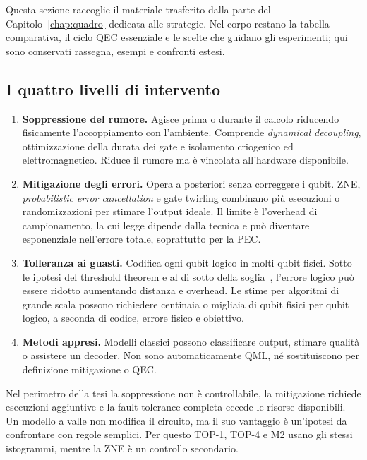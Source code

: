 Questa sezione raccoglie il materiale trasferito dalla parte del
Capitolo~\ref{chap:quadro} dedicata alle strategie. Nel corpo restano la tabella
comparativa, il ciclo QEC essenziale e le scelte che guidano gli esperimenti;
qui sono conservati rassegna, esempi e confronti estesi.

\subsection{I quattro livelli di intervento}

\begin{enumerate}
    \item \textbf{Soppressione del rumore.} Agisce prima o durante il calcolo
    riducendo fisicamente l'accoppiamento con l'ambiente. Comprende
    \emph{dynamical decoupling}, ottimizzazione della durata dei gate e
    isolamento criogenico ed elettromagnetico. Riduce il rumore ma è vincolata
    all'hardware disponibile.

    \item \textbf{Mitigazione degli errori.} Opera a posteriori senza
    correggere i qubit. \ac{ZNE}, \emph{probabilistic error cancellation} e
    gate twirling combinano più esecuzioni o randomizzazioni per stimare
    l'output ideale. Il limite è l'overhead di campionamento, la cui legge
    dipende dalla tecnica e può diventare esponenziale nell'errore totale,
    soprattutto per la PEC.

    \item \textbf{Tolleranza ai guasti.} Codifica ogni qubit logico in molti
    qubit fisici. Sotto le ipotesi del threshold theorem e al di sotto della
    soglia~\cite{aharonov1997fault}, l'errore logico può essere ridotto
    aumentando distanza e overhead. Le stime per algoritmi di grande scala
    possono richiedere centinaia o migliaia di qubit fisici per qubit logico,
    a seconda di codice, errore fisico e obiettivo.

    \item \textbf{Metodi appresi.} Modelli classici possono classificare
    output, stimare qualità o assistere un decoder. Non sono automaticamente
    \ac{QML}, né sostituiscono per definizione mitigazione o QEC.
\end{enumerate}

Nel perimetro della tesi la soppressione non è controllabile, la mitigazione
richiede esecuzioni aggiuntive e la fault tolerance completa eccede le risorse
disponibili. Un modello a valle non modifica il circuito, ma il suo vantaggio è
un'ipotesi da confrontare con regole semplici. Per questo TOP-1, TOP-4 e M2
usano gli stessi istogrammi, mentre la \ac{ZNE} è un controllo secondario.

